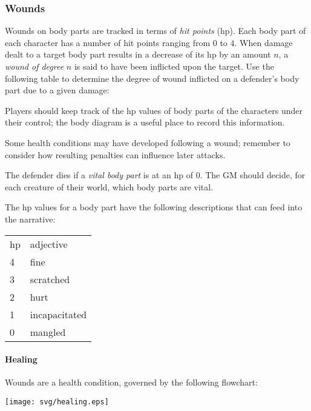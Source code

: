 \documentclass[12pt]{article}
\newcommand{\emdex}[1]{\emph{#1}\index{#1}}
\begin{document}
\subsubsection{Wounds}\label{sec:wounds}

Wounds on body parts are tracked in terms of \emdex{hit points} (hp).
Each body part of each character has a number of hit points ranging from
$0$ to $4$.
When damage dealt to a target body part results in a decrease of its hp by an amount $n$, 
a \emph{wound of degree}
$n$ is said to have been inflicted upon the target.
Use the following table to determine the degree of wound inflicted on a defender's body part
due to a given damage:
\begin{center}

\end{center}
Players should keep track of the hp values of body parts of the characters under their control;
the body diagram is a useful place to record this information.

Some health conditions may have developed following a wound;
remember to consider how resulting penalties can influence later attacks.

The defender dies if a \emdex{vital body part} is at an hp of $0$.
The GM should decide, for each creature of their world, which body parts are vital.

The hp values for a body part have the following descriptions that can feed into the narrative:
\begin{center}
{\setlength{\extrarowheight}{1pt}
\begin{tabular}{l|l}
hp & adjective \\
\cline{1-2}
4  & fine \\
3  & scratched \\
2  & hurt \\
1  & incapacitated \\
0  & mangled
\end{tabular}}
\end{center}

\paragraph{Healing} Wounds are a health condition, governed by the following flowchart:
\begin{center} \texttt{[image: svg/healing.eps]} \end{center}


\printindex
\end{document}
